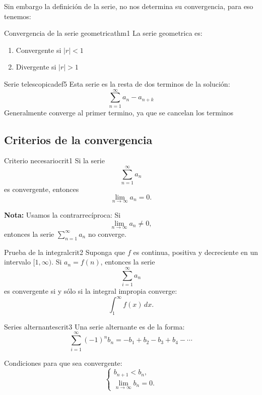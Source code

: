 Sin embargo la definición de la serie, no nos determina su convergencia, para eso tenemos:

\begin{teorema}{Convergencia de la serie geometrica}{thm1}
    La serie geometrica es: 
    \begin{enumerate}
        \item Convergente si $|r| < 1$
        \item Divergente si $|r| > 1$
    \end{enumerate}
\end{teorema}

\begin{definicion}{Serie telescopica}{def5}
    Esta serie es la resta de dos terminos de la solución:
    \[ 
        \sum_{n = 1}^{\infty} a_n - a_{n + k} 
    \]
    Generalmente converge al primer termino, ya que se cancelan los terminos
\end{definicion} 

\subsection{Criterios de la convergencia}
\begin{teorema}{Criterio necesario}{crit1}
    Si la serie 
    \[
        \sum_{n=1}^{\infty} a_n
    \]
    es convergente, entonces 
    \[
        \lim_{n \to \infty} a_n = 0.
    \]

    \textbf{Nota:} Usamos la contrarrecíproca:  
    Si 
    \[
        \lim_{n \to \infty} a_n \neq 0,
    \]
    entonces la serie 
    \(\sum_{n=1}^{\infty} a_n\) no converge.
\end{teorema}

\begin{teorema}{Prueba de la integral}{crit2}
    Suponga que $f$ es continua, positiva y decreciente en un intervalo $[1, \infty)$.  
    Si $a_n = f(n)$, entonces la serie
    \[
        \sum_{i=1}^{\infty} a_n
    \]
    es convergente si y sólo si la integral impropia converge:
    \[
        \int_{1}^{\infty} f(x)\,dx.
    \]
\end{teorema}

\begin{teorema}{Series alternantes}{crit3}
    Una serie alternante es de la forma:
    \[
        \sum_{i=1}^{\infty} (-1)^n b_n = -b_1 + b_2 - b_3 + b_4 - \cdots
    \]

    Condiciones para que sea convergente:
    \[
        \begin{cases}
            b_{n+1} < b_n, \\
            \lim_{n \to \infty} b_n = 0.
        \end{cases}
    \]
\end{teorema}

